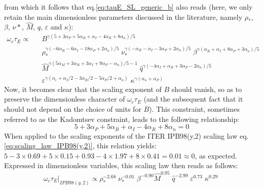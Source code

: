 from which it follows that eq.\ref{eq:tauE_SL_generic_b} also reads (here, we only retain the main dimensionless parameters discussed in the literature, namely $\rho_*$, $\beta$, $\nu*$, $\hat M$, $q$, $\varepsilon$ and $\kappa$): 
\begin{eqnarray}
\label{eq:tauE_SL_generic_dimensionless}
\omega_c \tau_E \propto &&
B^{\gamma(5+3\alpha_P+5\alpha_B+\alpha_I-4\alpha_R+8\alpha_n)/5} \nonumber\\
&&
\rho_*^{\gamma(-6\alpha_R-6\alpha_I-18\alpha_P+2\alpha_n)/5} \;
\nu_*^{\gamma(-\alpha_R-\alpha_I-3\alpha_P+2\alpha_n)/5} \;
\beta^{\gamma(\alpha_R+\alpha_I+8\alpha_P+3\alpha_n)/5}  \nonumber\\
&&
\hat M^{\gamma(5\alpha_M+3\alpha_R+3\alpha_I+9\alpha_P-\alpha_n)/5 - 1}  \;
\hat q^{\gamma(-4\alpha_I+\alpha_R+3\alpha_P-2\alpha_n)/5}  \nonumber\\
&&
\varepsilon^{\gamma(\alpha_\epsilon+\alpha_I/2-3\alpha_R/2-5\alpha_P/2+\alpha_n)}  \;
\kappa^{\gamma(\alpha_\kappa+\alpha_P)} 
\end{eqnarray}
Now, it becomes clear that the scaling exponent of $B$ should vanish, so as to preserve the dimensionless character of $\omega_c \tau_E$ (and the subsequent fact that it should not depend on the choice of units for $B$). This constraint, sometimes referred to as the Kadomtsev constraint, leads to the following relationship:
$$
5+3\alpha_P+5\alpha_B+\alpha_I-4\alpha_R+8\alpha_n = 0
$$
When applied to the scaling exponents of the ITER IPB98(y,2) scaling law eq.\ref{eq:scaling_law_IPB98(y,2)}, this relation yields: $5-3\times 0.69+5\times0.15+0.93-4\times1.97+8\times0.41 = 0.01 \approx 0$, as expected. Expressed in dimensionless variables, this scaling law then reads as follows:
\begin{equation}
\label{eq:scaling_law_IPB98(y,2)_dimensionless}
\left. \omega_c \tau_E \right|_{IPB98(y,2)}\propto 
\rho_*^{-2.68} \;
\nu_*^{-0.01} \;
\beta^{-0.90} 
\hat M^{0.95} \;
\hat q^{-2.99}  \;
\varepsilon^{0.73}  \;
\kappa^{0.29} \;
\end{equation}
